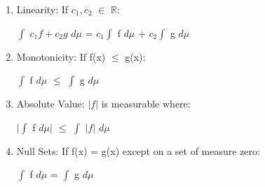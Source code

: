     \begin{enumerate}[label=(\alph*), leftmargin=2cm, itemsep=0.1cm]
        \item {\color{lgreen} Linearity}:
            If $c_1,c_2$ $\in$ $\mathbb{R}$:

            \hspace{0.5cm}
            $\int$ $c_1f + c_2g$ $d\mu$
            = $c_1 \int$ f $d\mu$ + $c_2 \int$ g $d\mu$

        \item {\color{lgreen} Monotonicity}:
            If f(x) $\leq$ g(x):

            \hspace{0.5cm}
            $\int$ f $d\mu$ $\leq$ $\int$ g $d\mu$

        \item {\color{lgreen} Absolute Value}:
            $|f|$ is measurable where:

            \hspace{0.5cm}
            $|\int$ f $d\mu|$
            $\leq$ $\int$ $|f|$ $d\mu$

        \item {\color{lgreen} Null Sets}:
            If f(x) = g(x) except on a set of measure zero:

            \hspace{0.5cm}
            $\int$ f $d\mu$ = $\int$ g $d\mu$
    \end{enumerate}

